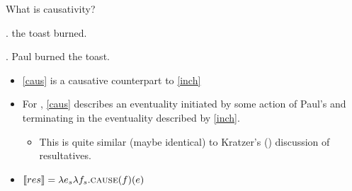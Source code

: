 \documentclass[Proposal]{subfiles}
\begin{document}
%  
%
%
%
\begin{frame}
  {What is causativity?}
  
  \ex.\label{inch} {\rm the toast burned.}

  \ex.\label{caus} {\rm Paul burned the toast.}

  \begin{itemize}
    \item \ref{caus} is a causative counterpart to \ref{inch}
      \pause
    \item For \textcite{pietroski2003small}, \ref{caus} describes an eventuality initiated by some action of Paul's and terminating in the eventuality described by \ref{inch}.
      \begin{itemize}
	\item This is quite similar (maybe identical) to Kratzer's (\citeyear{kratzer_building_2004}) discussion of resultatives.
      \end{itemize}
      \pause
    \item $\llbracket res \rrbracket = \lambda e_s \lambda f_s . \textsc{cause}(f)(e)$
  \end{itemize}
\end{frame}

%
\end{document}
